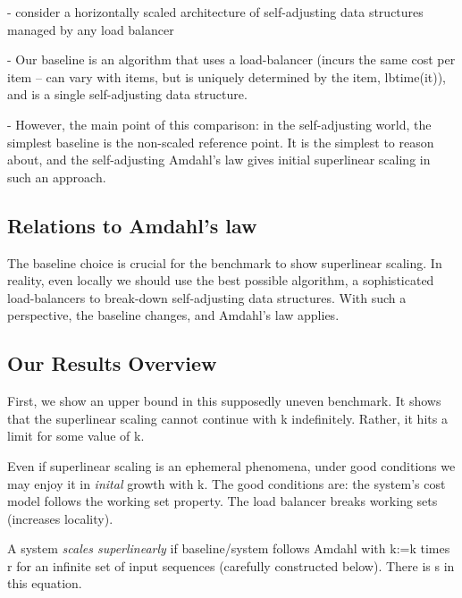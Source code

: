 - consider a horizontally scaled architecture of self-adjusting data structures managed by any load balancer

- Our baseline is an algorithm that uses a load-balancer (incurs the same cost per item -- can vary with items, but is uniquely determined by the item, lbtime(it)), and is a single self-adjusting data structure.

- However, the main point of this comparison: in the self-adjusting world, the simplest baseline is the non-scaled reference point. It is the simplest to reason about, and the self-adjusting Amdahl's law gives initial superlinear scaling in such an approach.


\subsection{Relations to Amdahl's law}

The baseline choice is crucial for the benchmark to show superlinear scaling.
In reality, even locally we should use the best possible algorithm, a sophisticated load-balancers to break-down self-adjusting data structures.
With such a perspective, the baseline changes, and Amdahl's law applies.

\subsection{Our Results Overview}

First, we show an upper bound in this supposedly uneven benchmark.
It shows that the superlinear scaling cannot continue with k indefinitely. Rather, it hits a limit for some value of k.

Even if superlinear scaling is an ephemeral phenomena, under good conditions we may enjoy it in \emph{inital} growth with k.
The good conditions are: the system's cost model follows the working set property. The load balancer breaks working sets (increases locality).








A system \emph{scales superlinearly} if baseline/system follows Amdahl with k:=k times r for an infinite set of input sequences (carefully constructed below). There is s in this equation.




